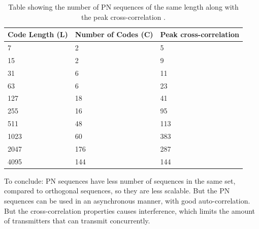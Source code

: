 \begin{table}[tbp]
	\centering
	\begin{tabular}{  | l | l | l | }

		\hline
		Code Length (L)	& Number of Codes (C) 	& Peak cross-correlation	\\ \hline
		
		7				& 2						& 5						\\ \hline					
		15				& 2						& 9						\\ \hline			
		31				& 6						& 11					\\ \hline			
		63				& 6						& 23					\\ \hline		
		127				& 18					& 41					\\ \hline		
		255				& 16					& 95					\\ \hline	
		511				& 48					& 113					\\ \hline	
		1023			& 60					& 383					\\ \hline		
		2047			& 176 					& 287					\\ \hline		
		4095			& 144					& 144					\\ \hline		


	\end{tabular}
	\caption{Table showing the number of PN sequences of the same length along with the peak cross-correlation \cite{kettunen1997code}. }
	\label{tbl:pn-sequences-C-and-cross-corr}

\end{table}


To conclude: PN sequences have less number of sequences in the same set, compared to orthogonal sequences, so they are less scalable.
But the PN sequences can be used in an asynchronous manner, with good auto-correlation.
But the cross-correlation properties causes interference, which limits the amount of transmitters that can transmit concurrently.










